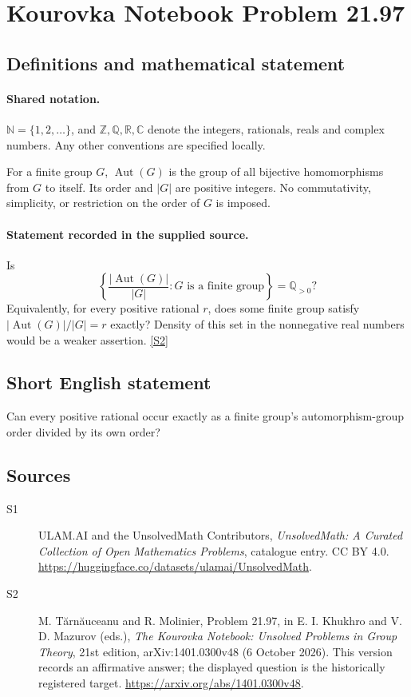 \documentclass[11pt]{article}
\newcommand{\sref}[2]{\hyperlink{source:#1:#2}{[S#2]}}
\begin{document}
\section{Kourovka Notebook Problem 21.97}\label{statement}

\subsection{Definitions and mathematical statement}

\paragraph{Shared notation.}$\mathbb N=\{1,2,\ldots\}$, and $\mathbb Z,\mathbb Q,\mathbb R,\mathbb C$ denote the integers, rationals, reals and complex numbers. Any other conventions are specified locally.


For a finite group $G$, $\operatorname{Aut}(G)$ is the group of all bijective homomorphisms from $G$ to itself. Its order and $|G|$ are positive integers. No commutativity, simplicity, or restriction on the order of $G$ is imposed.
\paragraph{Statement recorded in the supplied source.}
Is
\[
 \left\{\frac{|\operatorname{Aut}(G)|}{|G|}:G\text{ is a finite group}\right\}
 =\mathbb Q_{>0}?
\]
Equivalently, for every positive rational $r$, does some finite group satisfy $|\operatorname{Aut}(G)|/|G|=r$ exactly? Density of this set in the nonnegative real numbers would be a weaker assertion. \sref{statement}{2}
\subsection{Short English statement}
Can every positive rational occur exactly as a finite group’s automorphism-group order divided by its own order?
\subsection{Sources}
\begin{description}
\item[\hypertarget{source:statement:1}{S1}] ULAM.AI and the UnsolvedMath Contributors, \emph{UnsolvedMath: A Curated Collection of Open Mathematics Problems}, catalogue entry. CC BY 4.0. \url{https://huggingface.co/datasets/ulamai/UnsolvedMath}.
\item[\hypertarget{source:statement:2}{S2}] M. Tărnăuceanu and R. Molinier, Problem 21.97, in E. I. Khukhro and V. D. Mazurov (eds.), \emph{The Kourovka Notebook: Unsolved Problems in Group Theory}, 21st edition, arXiv:1401.0300v48 (6 October 2026). This version records an affirmative answer; the displayed question is the historically registered target. \url{https://arxiv.org/abs/1401.0300v48}.
\end{description}
\label{end:statement}
\end{document}
